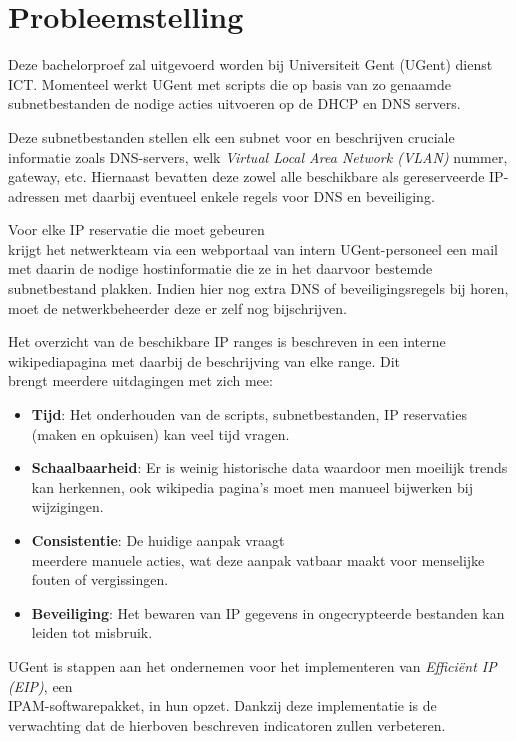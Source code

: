 \documentclass{hogent-article}
\begin{document}
\section{Probleemstelling}
\label{sec:probleemstelling}
Deze bachelorproef zal uitgevoerd worden bij Universiteit Gent (UGent) dienst ICT. Momenteel werkt UGent met scripts die op basis van zo genaamde subnetbestanden de nodige acties uitvoeren op de DHCP en DNS servers. 

Deze subnetbestanden stellen elk een subnet voor en beschrijven cruciale informatie zoals DNS-servers, welk \textit{Virtual Local Area Network (VLAN)} nummer, gateway, etc. Hiernaast bevatten deze zowel alle beschikbare als gereserveerde IP-adressen met daarbij eventueel enkele regels voor DNS en beveiliging.

Voor elke IP reservatie die moet gebeuren \\krijgt het netwerkteam via een webportaal van intern UGent-personeel een mail met daarin de nodige hostinformatie die ze in het daarvoor bestemde subnetbestand plakken. Indien hier nog extra DNS of beveiligingsregels bij horen, moet de netwerkbeheerder deze er zelf nog bijschrijven.

Het overzicht van de beschikbare IP ranges is beschreven in een interne wikipediapagina met daarbij de beschrijving van elke range. Dit \\brengt meerdere uitdagingen met zich mee:
\begin{itemize}
    \item \textbf{Tijd}: Het onderhouden van de scripts, subnetbestanden, IP reservaties (maken en opkuisen) kan veel tijd vragen.
    \item \textbf{Schaalbaarheid}: Er is weinig historische data waardoor men moeilijk trends kan herkennen, ook wikipedia pagina's moet men manueel bijwerken bij wijzigingen.
    \item \textbf{Consistentie}: De huidige aanpak vraagt \\meerdere manuele acties, wat deze aanpak vatbaar maakt voor menselijke fouten of vergissingen.  
    \item \textbf{Beveiliging}: Het bewaren van IP gegevens in ongecrypteerde bestanden kan leiden tot misbruik.
\end{itemize}

UGent is stappen aan het ondernemen voor het implementeren van \textit{Efficiënt IP (EIP)}, een \\IPAM-softwarepakket, in hun opzet. Dankzij deze implementatie is de verwachting dat de hierboven beschreven indicatoren zullen verbeteren.
\end{document}
